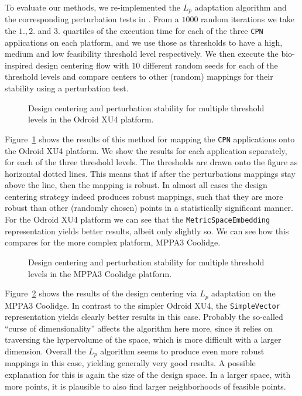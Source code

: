 To evaluate our methods, we re-implemented the $L_p$ adaptation algorithm and the corresponding perturbation tests in \mocasin. 
From a $1000$ random iterations we take the $1.,2.$ and $3.$ quartiles of the execution time for each of the three \texttt{CPN} applications on each platform, and we use those as thresholds to have a high, medium and low feasibility threshold level respectively.
We then execute the bio-inspired design centering flow with $10$ different random seeds for each of the threshold levels and compare centers to other (random) mappings for their stability using a perturbation test.

\begin{figure}[h]
	\centering
	\caption{Design centering and perturbation stability for multiple threshold levels in the Odroid XU4 platform.}
	\label{fig:design_centering_exynos}
\end{figure}

Figure~\ref{fig:design_centering_exynos} shows the results of this method for mapping the \texttt{CPN} applications onto the Odroid XU4 platform.
We show the results for each application separately, for each of the three threshold levels. The thresholds are drawn onto the figure as horizontal dotted lines. 
This means that if after the perturbations mappings stay above the line, then the mapping is robust.
In almost all cases the design centering strategy indeed produces robust mappings, such that they are more robust than other (randomly chosen) points in a statistically significant manner.
For the Odroid XU4 platform we can see that the \texttt{MetricSpaceEmbedding} representation yields better results, albeit only slightly so.
We can see how this compares for the more complex platform, MPPA3 Coolidge.

\begin{figure}[h]
	\centering
	\caption{Design centering and perturbation stability for multiple threshold levels in the MPPA3 Coolidge platform.}
	\label{fig:design_centering_coolidge}
\end{figure}

Figure~\ref{fig:design_centering_coolidge} shows the results of the design centering via $L_p$ adaptation on the MPPA3 Coolidge.
In contrast to the simpler Odroid XU4, the \texttt{SimpleVector} representation yields clearly better results in this case.
Probably the so-called ``curse of dimensionality'' affects the algorithm here more, since it relies on traversing the hypervolume of the space, which is more difficult with a larger dimension.
Overall the $L_p$ algorithm seems to produce even more robust mappings in this case, yielding generally very good results.
A possible explanation for this is again the size of the design space.
In a larger space, with more points, it is plausible to also find larger neighborhoods of feasible points.

